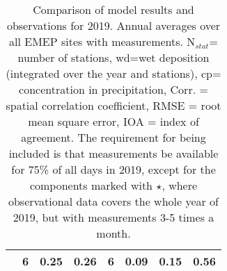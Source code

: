 \begin{table}
\begin{center}
\begin{tabular}{c|ccccccc}
   &  6  &   0.25  &   0.26 &    6 &  0.09 & 0.15 & 0.56\\%
\hline\hline

\end{tabular}

\vspace{0.2cm}

\caption{Comparison of model results and observations for 2019. Annual
averages over all EMEP sites with measurements.  N$_{stat}$= number of stations,
wd=wet deposition (integrated over the year and stations), cp= concentration
in precipitation, Corr. = spatial correlation coefficient, RMSE = root mean
square error, IOA = index of agreement. The requirement for being included
  is that measurements be available for 75\% of all days in 2019, except
  for the components marked with $\star$, where observational data covers
  the whole year of 2019, but with measurements 3-5 times a month.}
\label{tab:tableOldFashioned}
\end{center}
\end{table}







%

